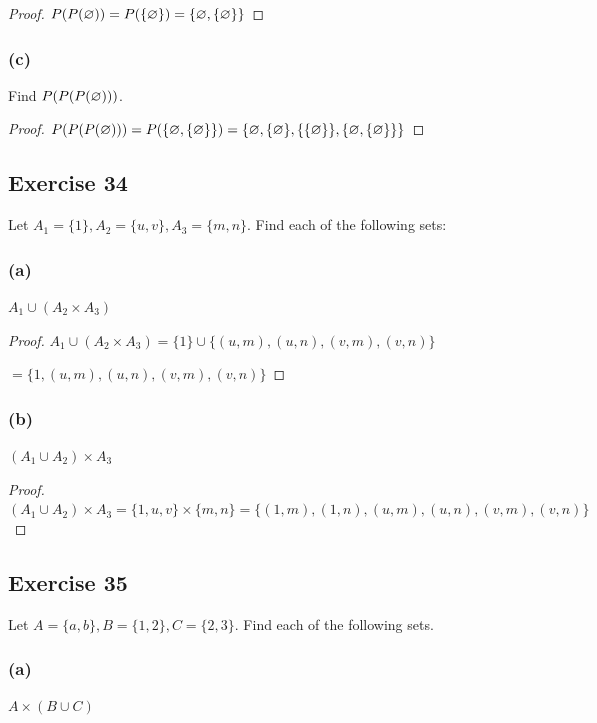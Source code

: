 \documentclass[14pt]{extarticle}
\let\mathscr\relax
\newcommand{\ps}{\mathscr{P}}
\newcommand{\es}{\varnothing}
\begin{document}
\begin{proof}
\(\ps(\ps(\es)) = \ps(\{\es\}) = \{\es, \{\es\}\}\)
\end{proof}

\subsubsection{(c)}
Find \(\ps(\ps(\ps(\es)))\).

\begin{proof}
\(\ps(\ps(\ps(\es))) = \ps(\{\es, \{\es\}\}) = \{\es, \{\es\}, \{\{\es\}\}, \{\es, \{\es\}\}\}\)
\end{proof}

\subsection{Exercise 34}
Let \(A_1 = \{1\}, A_2 = \{u, v\}, A_3 = \{m, n\}\). Find each of the following sets:

\subsubsection{(a)}
$A_1 \cup (A_2 \times A_3)$

\begin{proof}
\(A_1 \cup (A_2 \times A_3) = \{1\} \cup \{(u, m), (u, n), (v, m), (v, n)\}\)

\(= \{1, (u, m), (u, n), (v, m), (v, n)\}\)
\end{proof}

\subsubsection{(b)}
$(A_1 \cup A_2) \times A_3$

\begin{proof}
\((A_1 \cup A_2) \times A_3 = \{1, u, v\} \times \{m, n\} = \{(1, m), (1, n), (u, m), (u, n), (v, m), (v, n)\}\)
\end{proof}

\subsection{Exercise 35}
Let \(A = \{a, b\}, B = \{1, 2\}, C = \{2, 3\}\). Find each of the following sets.

\subsubsection{(a)}
$A \times (B \cup C)$
\end{document}
